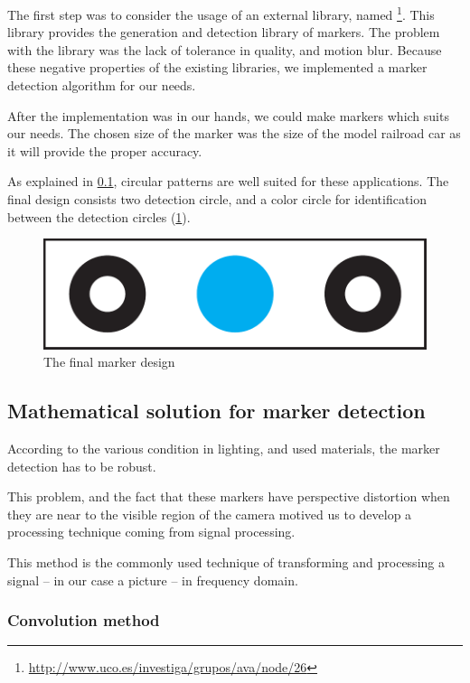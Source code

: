 The first step was to consider the usage of an external library, named \footnote{\url{http://www.uco.es/investiga/grupos/ava/node/26}}. This library provides the generation and detection library of markers. The problem with the library was the lack of tolerance in quality, and motion blur. Because these negative properties of the existing libraries, we implemented a marker detection algorithm for our needs.

After the implementation was in our hands, we could make markers which suits our needs. The chosen size of the marker was the size of the model railroad car as it will provide the proper accuracy.

As explained in \cref{fig:case_study:opencv_math}, circular patterns are well suited for these applications. The final design consists two detection circle, and a color circle for identification between the detection circles (\cref{fig:case_study:final_marker}).

\begin{figure}[h]
	\centering
	\includegraphics[width=0.5\linewidth]{include/figures/chapter_6/opencv_finalmarker}
	\caption{The final marker design}
	\label{fig:case_study:final_marker} 
\end{figure}

\subsection{Mathematical solution for marker detection}
\label{fig:case_study:opencv_math}


According to the various condition in lighting, and used materials, the marker detection has to be robust.

This problem, and the fact that these markers have perspective distortion when they are near to the visible region of the camera motived us to develop a processing technique coming from signal processing.

This method is the commonly used technique of transforming and processing a signal -- in our case a picture -- in frequency domain.

\subsubsection{Convolution method}
\label{sec:case_study:convolution}

